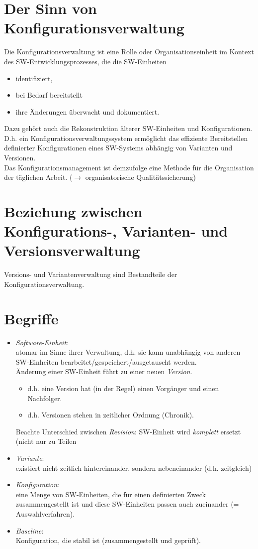 \documentclass{scrreprt}
\begin{document}
\section{Der Sinn von Konfigurationsverwaltung}
Die Konfigurationsverwaltung ist eine Rolle oder Organisationseinheit im Kontext des SW-Ent\-wick\-lungs\-prozesses, die die SW-Einheiten
\begin{itemize}
\item identifiziert,
\item bei Bedarf bereitstellt
\item ihre Änderungen überwacht und dokumentiert.
\end{itemize}
Dazu gehört auch die Rekonstruktion älterer SW-Einheiten und Konfigurationen.\\
D.h. ein Konfigurationsverwaltungssystem ermöglicht das effiziente Bereitstellen definierter
Konfigurationen eines SW-Systems abhängig von Varianten und Versionen.\\
Das Konfigurationsmanagement ist demzufolge eine Methode für die Organisation der täglichen
Arbeit. ($\to$ organisatorische Qualitätssicherung)

\section{Beziehung zwischen Konfigurations-, Varianten- und Versionsverwaltung}
Versions- und Variantenverwaltung sind Bestandteile der Konfigurationsverwaltung.

\section{Begriffe}
\begin{itemize}
\item \emph{Software-Einheit}:\\
atomar im Sinne ihrer Verwaltung, d.h. sie kann unabhängig von anderen SW-Einheiten bearbeitet/gespeichert/ausgetauscht werden.\\
Änderung einer SW-Einheit führt zu einer neuen \emph{Version}.
\begin{itemize}[label=$\rightarrow$]
\item d.h. eine Version hat (in der Regel) einen Vorgänger und einen Nachfolger.
\item d.h. Versionen stehen in zeitlicher Ordnung (Chronik).
\end{itemize}
Beachte Unterschied zwischen \emph{Revision}: SW-Einheit wird \emph{komplett} ersetzt (nicht nur zu Teilen
\item \emph{Variante}:\\
existiert nicht zeitlich hintereinander, sondern nebeneinander (d.h. zeitgleich)
\item \emph{Konfiguration}:\\
eine Menge von SW-Einheiten, die für einen definierten Zweck zusammengestellt ist und diese SW-Einheiten passen auch zueinander (= Auswahlverfahren).
\item \emph{Baseline}:\\
Konfiguration, die stabil ist (zusammengestellt und geprüft).
\end{itemize}
\end{document}
